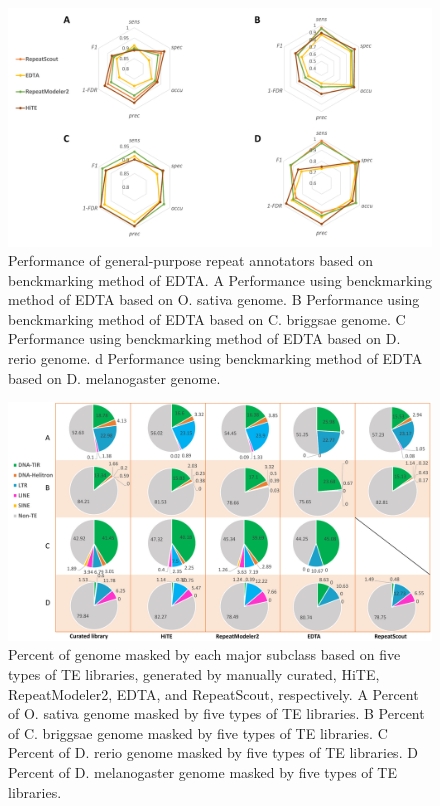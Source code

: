 \documentclass{bmcart}
\begin{document}
\begin{figure}[h!]
	\centerline{\includegraphics[width=1.0\textwidth]{figures/EDTAResults.pdf}}
	\caption{Performance of general-purpose repeat annotators based on benckmarking method of EDTA.  A Performance using benckmarking method of EDTA based on O. sativa genome. B Performance using benckmarking method of EDTA based on C. briggsae genome. C Performance using benckmarking method of EDTA based on D. rerio genome. d Performance using benckmarking method of EDTA based on D. melanogaster genome.}
	\label{fig:edta_results}
\end{figure}

\begin{figure}[h!]
	\centerline{\includegraphics[width=1.0\textwidth]{figures/RatioResults.pdf}}
	\caption{Percent of genome masked by each major subclass based on five types of TE libraries, generated by manually curated, HiTE, RepeatModeler2, EDTA, and RepeatScout, respectively. A Percent of O. sativa genome masked by five types of TE libraries. B Percent of C. briggsae genome masked by five types of TE libraries. C Percent of D. rerio genome masked by five types of TE libraries. D Percent of  D. melanogaster genome masked by five types of TE libraries.}
	\label{fig:ratio_results}
\end{figure}
\end{document}
